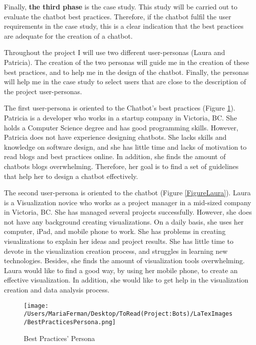 \documentclass[a4paper,10pt]{article}
\begin{document}
Finally, \textbf{the third phase} is the case study. This study will be carried out to evaluate the chatbot best practices. Therefore, if the chatbot fulfil the user requirements in the case study, this is a clear indication that the best practices are adequate for the creation of a chatbot.

 
Throughout the project I will use two different user-personas (Laura and Patricia). The creation of the two personas will guide me in the creation of these best practices, and to help me in the design of the chatbot. Finally, the personas will help me in the case study to select users that are close to the description of the project user-personas. 

The first user-persona is oriented to the Chatbot's best practices (Figure \ref{FigurePatricia}). Patricia is a developer who works in a startup company in Victoria, BC. She holds a Computer Science degree and has good programming skills. However, Patricia does not have experience designing chatbots. She lacks skills and knowledge on software design, and she has little time and lacks of motivation to read blogs and best practices online. In addition, she finds the amount of chatbots blogs overwhelming. Therefore, her goal is to find a set of guidelines that help her to design a chatbot effectively. 

The second user-persona is oriented to the chatbot (Figure \ref{FigureLaura}). Laura is a Visualization novice who works as a project manager in a mid-sized company in Victoria, BC. She has managed several projects successfully. However, she does not have any background creating visualizations. On a daily basis, she uses her computer, iPad, and mobile phone to work. She has problems in creating visualizations to explain her ideas and project results. She has little time to devote in the visualization creation process, and struggles in learning new technologies. Besides, she finds the amount of visualization tools overwhelming. Laura would like to find a good way, by using her mobile phone, to create an effective visualization. In addition, she would like to get help in the visualization creation and data analysis process.  
\begin{figure}
\centering
\texttt{[image: /Users/MariaFerman/Desktop/ToRead(Project:Bots)/LaTexImages/BestPracticesPersona.png]}
\caption{Best Practices' Persona}
\label{FigurePatricia}
\end{figure}
\end{document}
